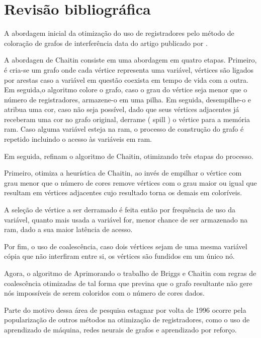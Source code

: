 \section{Revisão bibliográfica}

A abordagem inicial da otimização do uso de registradores pelo método de coloração de grafos de interferência data do artigo publicado por \textcite{chaitin}.

A abordagen de Chaitin consiste em uma abordagem em quatro etapas. Primeiro, é cria-se um grafo onde cada vértice representa uma variável,
vértices são ligados por arestas caso a variável em questão coexista em tempo de vida com a outra. Em seguida,o algoritmo colore o grafo,
caso o grau do vértice seja menor que o número de registradores, armazene-o em uma pilha. Em seguida, desempilhe-o e atribua uma cor,
caso não seja possível, dado que seus vértices adjacentes já receberam uma cor no grafo original, derrame ( spill ) o vértice para a
memória ram. Caso alguma variável esteja na ram, o processo de construção do grafo é repetido incluindo o acesso às variáveis em ram.

Em seguida, \textcite{briggs} refinam o algoritmo de Chaitin, otimizando três etapas do processo.

Primeiro, otimiza a heurística de Chaitin, ao invés de empilhar o vértice com grau menor que o número de cores remove vértices com o
grau maior ou igual que resultam em vértices adjacentes cujo resultado torna os demais em coloríveis.

A seleção de vértice a ser derramado é feita então por frequência de uso da variável, quanto mais usada a variável for, menor
chance de ser armazenado na ram, dado a sua maior latência de acesso.

Por fim, o uso de coalescência, caso dois vértices sejam de uma mesma variável cópia que não interfiram entre si, os vértices são fundidos em um único nó.

Agora, o algoritmo de \textcite{irc} Aprimorando o trabalho de Briggs e Chaitin com regras de coalescência otimizadas de tal forma que previna que
o grafo resultante não gere nós impossíveis de serem coloridos com o número de cores dados.

Parte do motivo dessa área de pesquisa estagnar por volta de 1996 ocorre pela popularização de outros métodos na otimização de registradores,
como o uso de aprendizado de máquina, redes neurais de grafos e aprendizado por reforço.
